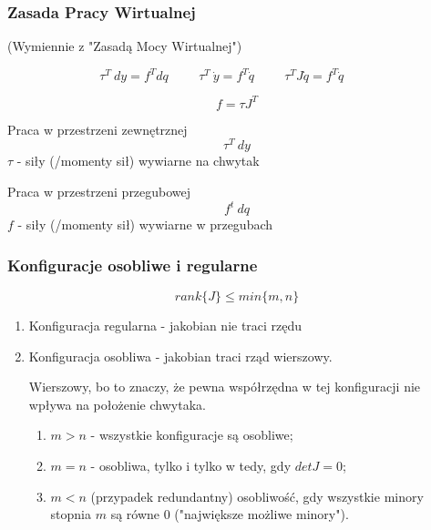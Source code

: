 \documentclass{article}
\newenvironment{kol2}{\noindent \begin{minipage}[t]{0.5\linewidth}}{\end{minipage}}
\begin{document}
\subsubsection{Zasada Pracy Wirtualnej}
(Wymiennie z "Zasadą Mocy Wirtualnej")

$$  \tau^T\ dy = f^T dq                 \hspace{1cm}
    \tau^T\ \dot{y} = f^T \dot{q}       \hspace{1cm}
    \tau^T J \dot{q} = f^T \dot{q}      \hspace{1cm}
$$

\Large
$$ f = \tau J^T $$
\normalsize

\begin{kol2}
    Praca w przestrzeni zewnętrznej
    $$ \tau^T\ dy $$
    $\tau$ - siły (/momenty sił) wywiarne na chwytak
\end{kol2}
\begin{kol2}
    Praca w przestrzeni przegubowej
    $$ f^t\ dq$$
    $f$ - siły (/momenty sił) wywiarne w przegubach
\end{kol2}

\subsubsection{Konfiguracje osobliwe i regularne}

$$ rank\{J\} \leq min\{ m, n \} $$

\begin{enumerate}
    \item Konfiguracja regularna - jakobian nie traci rzędu
    \item Konfiguracja osobliwa - jakobian traci rząd wierszowy.

          Wierszowy, bo to znaczy, że pewna współrzędna w tej konfiguracji nie wpływa na położenie chwytaka.

          \begin{enumerate}
              \item $m > n$ - wszystkie konfiguracje są osobliwe;
              \item $m = n$ - osobliwa, tylko i tylko w tedy, gdy $ det{J} = 0$;
              \item $m < n$ (przypadek redundantny) osobliwość,
                    gdy wszystkie minory stopnia $m$ są równe $0$ ("największe możliwe minory").
          \end{enumerate}

\end{enumerate}
\end{document}
